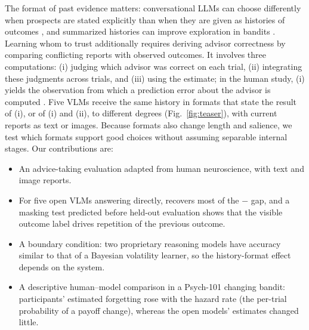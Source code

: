 The format of past evidence matters: conversational LLMs can choose differently when prospects are stated explicitly than when they are given as histories of outcomes \citep{ge2026dhgap}, and summarized histories can improve exploration in bandits \citep{krishnamurthy2024explore}. Learning whom to trust additionally requires deriving advisor correctness by comparing conflicting reports with observed outcomes. It involves three computations: (i) judging which advisor was correct on each trial, (ii) integrating these judgments across trials, and (iii) using the estimate; in the human study, (i) yields the observation from which a prediction error about the advisor is computed \citep{behrens2008associative}. Five VLMs receive the same history in formats that state the result of (i), or of (i) and (ii), to different degrees (Fig.~\ref{fig:teaser}), with current reports as text or images. Because formats also change length and salience, we test which formats support good choices without assuming separable internal stages. Our contributions are:
\begin{itemize}
  \item[$\bullet$] An advice-taking evaluation adapted from human neuroscience, with text and image reports.
  \item[$\bullet$] For five open VLMs answering directly, \CorrectnessOnly{} recovers most of the \Summary{}$-$\Raw{} gap, and a masking test predicted before held-out evaluation shows that the visible outcome label drives repetition of the previous outcome.
  \item[$\bullet$] A boundary condition: two proprietary reasoning models have \Raw{} accuracy similar to that of a Bayesian volatility learner, so the history-format effect depends on the system.
  \item[$\bullet$] A descriptive human--model comparison in a Psych-101 changing bandit: participants' estimated forgetting rose with the hazard rate (the per-trial probability of a payoff change), whereas the open models' estimates changed little.
\end{itemize}

